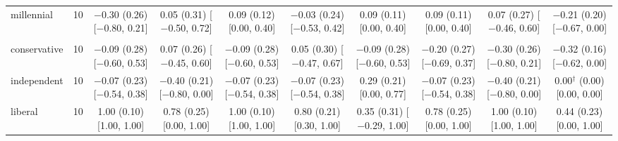 \begin{table}[t]
\begin{tabular}{@{}lr*{8}{c}@{}}
\quad millennial & 10 & \makecell{$-$0.30 (0.26)\\ {[}$-$0.80, 0.21{]}} & \makecell{0.05 (0.31)\\ {[}$-$0.50, 0.72{]}} & \makecell{0.09 (0.12)\\ {[}0.00, 0.40{]}} & \makecell{$-$0.03 (0.24)\\ {[}$-$0.53, 0.42{]}} & \makecell{0.09 (0.11)\\ {[}0.00, 0.40{]}} & \makecell{0.09 (0.11)\\ {[}0.00, 0.40{]}} & \makecell{0.07 (0.27)\\ {[}$-$0.46, 0.60{]}} & \makecell{$-$0.21 (0.20)\\ {[}$-$0.67, 0.00{]}} \\
\addlinespace
\multicolumn{10}{@{}l}{\textit{Politics (N)}} \\
\quad conservative & 10 & \makecell{$-$0.09 (0.28)\\ {[}$-$0.60, 0.53{]}} & \makecell{0.07 (0.26)\\ {[}$-$0.45, 0.60{]}} & \makecell{$-$0.09 (0.28)\\ {[}$-$0.60, 0.53{]}} & \makecell{0.05 (0.30)\\ {[}$-$0.47, 0.67{]}} & \makecell{$-$0.09 (0.28)\\ {[}$-$0.60, 0.53{]}} & \makecell{$-$0.20 (0.27)\\ {[}$-$0.69, 0.37{]}} & \makecell{$-$0.30 (0.26)\\ {[}$-$0.80, 0.21{]}} & \makecell{$-$0.32 (0.16)\\ {[}$-$0.62, 0.00{]}} \\
\quad independent & 10 & \makecell{$-$0.07 (0.23)\\ {[}$-$0.54, 0.38{]}} & \makecell{$-$0.40 (0.21)\\ {[}$-$0.80, 0.00{]}} & \makecell{$-$0.07 (0.23)\\ {[}$-$0.54, 0.38{]}} & \makecell{$-$0.07 (0.23)\\ {[}$-$0.54, 0.38{]}} & \makecell{0.29 (0.21)\\ {[}0.00, 0.77{]}} & \makecell{$-$0.07 (0.23)\\ {[}$-$0.54, 0.38{]}} & \makecell{$-$0.40 (0.21)\\ {[}$-$0.80, 0.00{]}} & \makecell{0.00$^\dagger$ (0.00)\\ {[}0.00, 0.00{]}} \\
\quad liberal & 10 & \makecell{1.00 (0.10)\\ {[}1.00, 1.00{]}} & \makecell{0.78 (0.25)\\ {[}0.00, 1.00{]}} & \makecell{1.00 (0.10)\\ {[}1.00, 1.00{]}} & \makecell{0.80 (0.21)\\ {[}0.30, 1.00{]}} & \makecell{0.35 (0.31)\\ {[}$-$0.29, 1.00{]}} & \makecell{0.78 (0.25)\\ {[}0.00, 1.00{]}} & \makecell{1.00 (0.10)\\ {[}1.00, 1.00{]}} & \makecell{0.44 (0.23)\\ {[}0.00, 1.00{]}} \\

\end{tabular}
\end{table}
